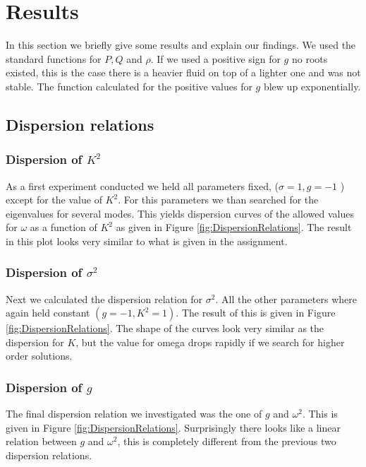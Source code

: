 \section{Results}

In this section we briefly give some results and explain our findings.
We used the standard functions for $ P,Q $ and $ \rho $.
If we used a positive sign for $ g $ no roots existed, this is the case there is a heavier fluid on top of a lighter one and was not stable.
The function calculated for the positive values for $ g $ blew up exponentially.

\subsection{Dispersion relations}

\subsubsection{Dispersion of $ K^2 $}
As a first experiment conducted we held all parameters fixed, ($ \sigma = 1, g = -1 $ ) except for the value of $ K^2 $.
For this parameters we than searched for the eigenvalues for several modes.
This yields dispersion curves of the allowed values for $ \omega $ as a function of $ K^2 $ as given in Figure \ref{fig:DispersionRelations}.
The result in this plot looks very similar to what is given in the assignment.


\subsubsection{Dispersion of $ \sigma^2 $}
Next we calculated the dispersion relation for $ \sigma^2 $. All the other parameters where again held constant $ (g = -1,K^2 = 1) $.
The result of this is given in Figure \ref{fig:DispersionRelations}.
The shape of the curves look very similar as the dispersion for $ K $, but the value for omega drops rapidly if we search for higher order solutions.


\subsubsection{Dispersion of $ g $}
The final dispersion relation we investigated was the one of $ g $ and $ \omega^2 $.
This is given in Figure \ref{fig:DispersionRelations}.
Surprisingly there looks like a linear relation between $ g $ and $ \omega^2 $, this is completely different from the previous two dispersion relations.

